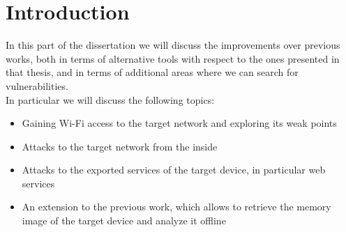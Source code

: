 \chapter{Introduction}
In this part of the dissertation we will discuss the improvements over
previous works\cite{previouswork}, both in terms of alternative tools
with respect to the ones presented in that thesis, and in terms of additional
areas where we can search for vulnerabilities.\\
In particular we will discuss the following topics:
\begin{itemize}
    \item Gaining Wi-Fi access to the target network and exploring its weak points
    \item Attacks to the target network from the inside
    \item Attacks to the exported services of the target device, in particular web services
    \item An extension to the previous work, which allows to retrieve the memory
        image of the target device and analyze it offline
\end{itemize}
\newpage